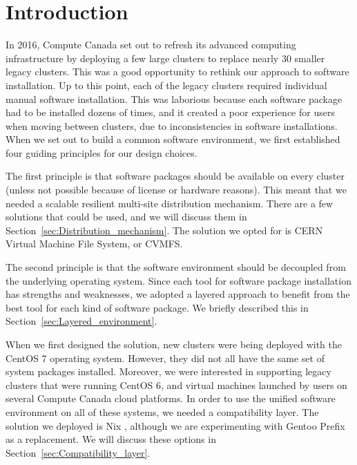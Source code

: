 \documentclass[sigconf]{acmart}
\begin{document}
%
\maketitle

\section{Introduction}
\label{sec:Introduction}
In 2016, Compute Canada set out to refresh its advanced computing infrastructure by deploying a few large clusters to replace nearly 30 smaller legacy clusters. This was a good opportunity to rethink our approach to software installation. Up to this point, each of the legacy clusters required individual manual software installation. This was laborious because each software package had to be installed dozens of times, and it created a poor experience for users when moving between clusters, due to inconsistencies in software installations. When we set out to build a common software environment, we first established four guiding principles for our design choices.

The first principle is that software packages should be available on every cluster (unless not possible because of license or hardware reasons). This meant that we needed a scalable resilient multi-site distribution mechanism. There are a few solutions that could be used, and we will discuss them in Section~\ref{sec:Distribution_mechanism}. The solution we opted for is CERN Virtual Machine File System, or CVMFS\cite{CVMFS}.

The second principle is that the software environment should be decoupled from the underlying operating system. Since each tool for software package installation has strengths and weaknesses, we adopted a layered approach to benefit from the best tool for each kind of software package. We briefly described this in Section~\ref{sec:Layered_environment}.

When we first designed the solution, new clusters were being deployed with the CentOS 7 operating system. However, they did not all have the same set of system packages installed. Moreover, we were interested in supporting legacy clusters
that were running CentOS 6, and virtual machines launched by users on several Compute Canada cloud platforms. In order to use the unified software environment on all of these systems, we needed a compatibility layer. 
The solution we deployed is Nix \cite{Nix}, although we are experimenting with Gentoo Prefix \cite{Gentoo} as a replacement. We will discuss these options in Section~\ref{sec:Compatibility_layer}.
\end{document}
